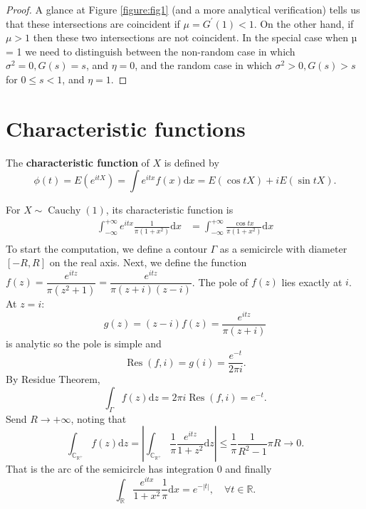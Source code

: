 \documentclass[11pt,singlecolumn, openany, citestyle=authoryear]{elegantbook}
\begin{document}
\begin{CJK}{UTF8}{gbsn}
\begin{proof}
A glance at Figure \ref{figure:fig1} (and a more analytical verification) tells us that
these intersections are coincident if $\mu = G^\prime(1) < 1$. On the other hand, 
if $\mu > 1$ then these two intersections are not coincident. In the special case when µ = 1 we need to distinguish
between the non-random case in which $\sigma^2 = 0, G(s) = s$, 
and $\eta = 0$, and the random case in which $\sigma^2 > 0, G(s) > s$ 
for $0 \leqslant s < 1$, and $\eta = 1$.
\end{proof}

\section{Characteristic functions}
\begin{definition}
    The \textbf{characteristic function} of $X$ is defined by 
    $$
    \phi(t)=E(e^{itX})=\int e^{itx}f(x)\mathrm{d}x = E(\cos tX)+i E(\sin tX).
    $$
\end{definition}
\begin{example}
    For $X\sim \operatorname{Cauchy}(1)$, its characteristic function is 
    \begin{align*}
    \int_{-\infty}^{+\infty} e^{itx}\frac{1}{\pi(1+x^2)}\mathrm{d}x &= 
    \int_{-\infty}^{+\infty}\frac{\cos tx}{\pi(1+x^2)}\mathrm{d}x\\
    \end{align*}
    To start the computation, we define a contour $\Gamma$ as a semicircle with diameter $[-R, R]$ on the real axis.
    Next, we define the function $f(z)=\dfrac{e^{itz}}{\pi(z^2+1)}=\dfrac{e^{itz}}{\pi(z+i)(z-i)}$.
    The pole of $f(z)$ lies exactly at $i$. At $z=i$:
    $$
    g(z)=(z-i)f(z)=\frac{e^{itz}}{\pi(z+i)}
    $$
    is analytic so the pole is simple and 
    $$
    \operatorname{Res}(f,i)=g(i)=\frac{e^{-t}}{2\pi i}.
    $$
    By Residue Theorem, 
    $$
    \int_\Gamma f(z)\mathrm{d}z = 2\pi i \operatorname{Res}(f,i) = e^{-t}.
    $$
    Send $R\to+\infty$, noting that 
    $$
    \int_{\mathbb{C}_{\mathbb{R}^+}} f(z)\mathrm{d}z = \left|
        \int_{\mathbb{C}_{\mathbb{R}^+}} \frac{1}{\pi} \frac{e^{itz}}{1+z^2} \mathrm{d}z
    \right|\leqslant \frac{1}{\pi} \frac{1}{R^2-1}\pi R \to 0.
    $$
    That is the arc of the semicircle has integration $0$ and finally
    $$
    \int_{\mathbb{R}}\frac{e^{itx}}{1+x^2}\frac{1}{\pi}\mathrm{d}x = e^{-|t|},\quad 
    \forall t \in \mathbb{R}.
    $$
\end{example}
\begin{figure}[h]
    \centering
    \begin{tikzpicture}

\end{tikzpicture}
\end{figure}
\end{CJK}
\end{document}
